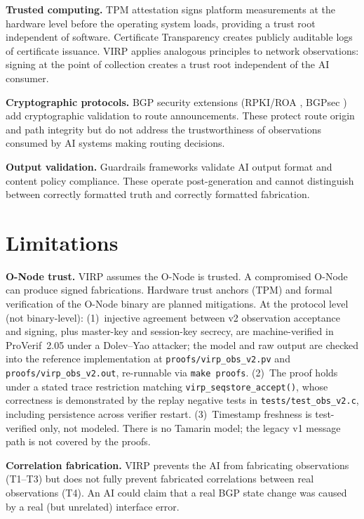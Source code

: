 \documentclass[11pt,twocolumn]{article}
\begin{document}
\textbf{Trusted computing.} TPM attestation \cite{tpm2} signs platform measurements at the hardware level before the operating system loads, providing a trust root independent of software. Certificate Transparency \cite{rfc6962} creates publicly auditable logs of certificate issuance. VIRP applies analogous principles to network observations: signing at the point of collection creates a trust root independent of the AI consumer.

\textbf{Cryptographic protocols.} BGP security extensions (RPKI/ROA \cite{rfc6480}, BGPsec \cite{rfc8205}) add cryptographic validation to route announcements. These protect route origin and path integrity but do not address the trustworthiness of observations consumed by AI systems making routing decisions.

\textbf{Output validation.} Guardrails frameworks \cite{guardrails} validate AI output format and content policy compliance. These operate post-generation and cannot distinguish between correctly formatted truth and correctly formatted fabrication.

\section{Limitations}

\textbf{O-Node trust.} VIRP assumes the O-Node is trusted. A compromised O-Node can produce signed fabrications. Hardware trust anchors (TPM) and formal verification of the O-Node binary are planned mitigations. At the protocol level (not binary-level): (1)~injective agreement between v2 observation acceptance and signing, plus master-key and session-key secrecy, are machine-verified in ProVerif~2.05 under a Dolev--Yao attacker; the model and raw output are checked into the reference implementation at \texttt{proofs/virp\_obs\_v2.pv} and \texttt{proofs/virp\_obs\_v2.out}, re-runnable via \texttt{make proofs}. (2)~The proof holds under a stated trace restriction matching \texttt{virp\_seqstore\_accept()}, whose correctness is demonstrated by the replay negative tests in \texttt{tests/test\_obs\_v2.c}, including persistence across verifier restart. (3)~Timestamp freshness is test-verified only, not modeled. There is no Tamarin model; the legacy v1 message path is not covered by the proofs.

\textbf{Correlation fabrication.} VIRP prevents the AI from fabricating observations (T1--T3) but does not fully prevent fabricated correlations between real observations (T4). An AI could claim that a real BGP state change was caused by a real (but unrelated) interface error.
\end{document}
